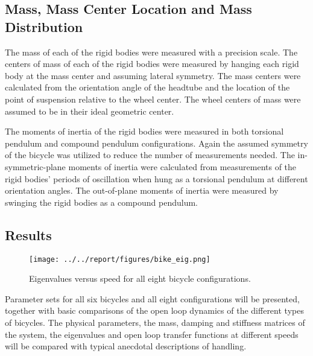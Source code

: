 \documentclass{bmd2010a}
\begin{document}
\subsection*{Mass, Mass Center Location and Mass Distribution}
The mass of each of the rigid bodies were measured with a precision scale.
The centers of mass of each of the rigid bodies were measured by hanging each
rigid body at the mass center and assuming lateral symmetry. The mass centers
were calculated from the orientation angle of the headtube and the location of
the point of suspension relative to the wheel center.
The wheel centers of mass were assumed to be in their ideal
geometric center.

The moments of inertia of the rigid bodies were measured in both torsional
pendulum and compound pendulum configurations. Again the assumed symmetry of the
bicycle was utilized to reduce the number of measurements needed. The
in-symmetric-plane moments of inertia were calculated from measurements of the
rigid bodies' periods of oscillation when hung as a torsional pendulum at
different orientation angles. The out-of-plane moments of inertia were
measured by swinging the rigid bodies as a compound pendulum.
\subsection*{Results}
\begin{figure}[htbp]
    \begin{center}
        \texttt{[image: ../../report/figures/bike\_eig.png]}
    \end{center}
    \caption{Eigenvalues versus speed for all eight bicycle configurations.}
    \label{fig:bike_eig}
\end{figure}

Parameter sets for all six bicycles and all eight
configurations  will be presented, together with basic comparisons of the open loop dynamics of the
different types of bicycles. The physical parameters, the mass, damping and stiffness
matrices of the system, the eigenvalues and open loop transfer functions at
different speeds will be compared with typical anecdotal
descriptions of handling.



\end{document}
